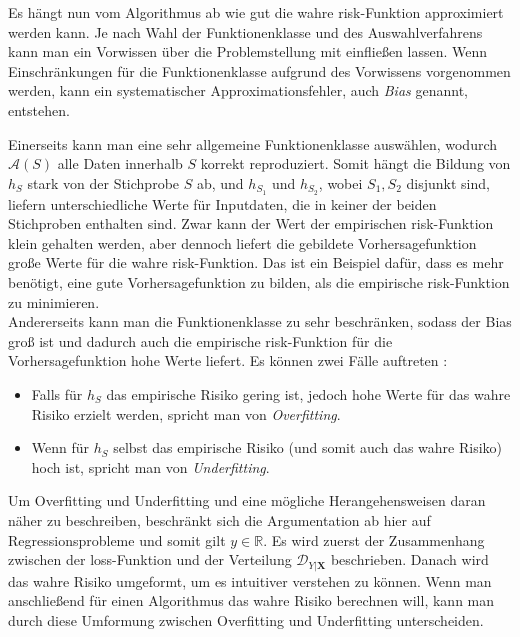 Es h\"angt nun vom Algorithmus ab wie gut die wahre risk-Funktion approximiert werden kann. Je nach Wahl der Funktionenklasse und des
Auswahlverfahrens kann man ein Vorwissen \"uber die Problemstellung mit einflie{\ss}en lassen. Wenn Einschr\"ankungen f\"ur die
Funktionenklasse aufgrund des Vorwissens vorgenommen werden, kann ein systematischer Approximationsfehler, auch \textit{Bias} genannt, entstehen.


Einerseits kann man eine sehr allgemeine Funktionenklasse ausw\"ahlen, wodurch $\mathcal{A}(S)$ alle Daten innerhalb $S$ korrekt reproduziert. Somit
h\"angt die Bildung von $h_S$ stark von der Stichprobe $S$ ab, und $h_{S_1}$ und $h_{S_2}$, wobei $S_1, S_2$ disjunkt sind, liefern unterschiedliche Werte f\"ur Inputdaten,
die in keiner der beiden Stichproben enthalten sind. Zwar kann der Wert der empirischen risk-Funktion klein gehalten werden, aber dennoch liefert die gebildete
Vorhersagefunktion gro{\ss}e Werte f\"ur die wahre risk-Funktion. Das ist ein Beispiel daf\"ur, dass es mehr ben\"otigt, eine gute Vorhersagefunktion zu bilden, als
die empirische risk-Funktion zu minimieren. \\


Andererseits kann man die Funktionenklasse zu sehr beschr\"anken, sodass der Bias gro{\ss} ist und dadurch auch die empirische risk-Funktion f\"ur die
Vorhersagefunktion hohe Werte liefert. Es k\"onnen zwei F\"alle auftreten \cite[Seite 374]{strang}:
\begin{itemize}
	\item Falls f\"ur $h_S$ das empirische Risiko gering ist, jedoch hohe Werte f\"ur das wahre Risiko erzielt werden, spricht man von \textit{Overfitting}.
	\item Wenn f\"ur $h_S$ selbst das empirische Risiko (und somit auch das wahre Risiko) hoch ist, spricht man von \textit{Underfitting}.
\end{itemize}

Um Overfitting und Underfitting und eine m\"ogliche Herangehensweisen daran n\"aher zu beschreiben, beschr\"ankt sich die Argumentation ab hier auf Regressionsprobleme und somit gilt
$y \in \mathbb{R}$. Es wird zuerst der Zusammenhang zwischen der loss-Funktion und der Verteilung $\mathcal{D}_{Y|\mathbf{X}}$ beschrieben. Danach
wird das wahre Risiko umgeformt, um es intuitiver verstehen zu k\"onnen. Wenn man anschlie{\ss}end f\"ur einen Algorithmus das wahre Risiko berechnen will,
kann man durch diese Umformung zwischen Overfitting und Underfitting unterscheiden.


